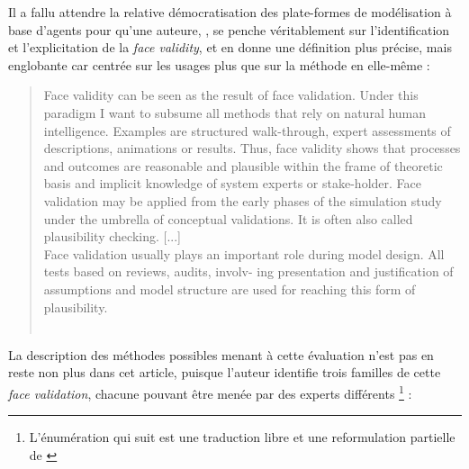 Il a fallu attendre la relative démocratisation des plate-formes de modélisation à base d'agents pour qu'une auteure, \citeauthor{klugl_validation_2008}, se penche véritablement sur l'identification et l'explicitation de la \textit{face validity}, et en donne une définition plus précise, mais englobante car centrée sur les usages plus que sur la méthode en elle-même :

\begin{quotation}
	\noindent \og Face validity can be seen as the result of face validation. Under this paradigm I want to subsume all methods that rely on natural human intelligence. Examples are structured walk-through, expert assessments of descriptions, animations or results. Thus, face validity shows that processes and outcomes are reasonable and plausible within the frame of theoretic basis and implicit knowledge of system experts or stake-holder. Face validation may be applied from the early phases of the simulation study under the umbrella of conceptual validations. It is often also called plausibility checking.
	[...]\\
	Face validation usually plays an important role during
	model design. All tests based on reviews, audits, involv-
	ing presentation and justification of assumptions and model
	structure are used for reaching this form of plausibility.
	\fg{}\\
	\mbox{}~ \hfill \textcite[39--41]{klugl_validation_2008}
\end{quotation}


La description des méthodes possibles menant à cette évaluation n'est pas en reste non plus dans cet article, puisque l'auteur identifie trois familles de cette \textit{face validation}, chacune pouvant être menée par des experts différents \footnote{L'énumération qui suit est une traduction libre et une reformulation partielle de \textcite[41-42]{klugl_validation_2008}} :

